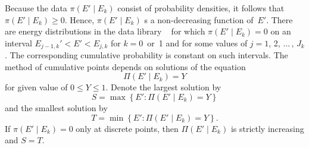 Because the data $\pi( E' \mid E_k)$ consist of probability densities,
it follows that $\pi( E' \mid E_k) \ge 0$.  Hence, $\pi( E' \mid E_k)$ 
s a non-decreasing function of~$E'$.  There are
energy distributions in the data library
\xendl~\cite{GND} for which $\pi( E' \mid E_k ) = 0$
on an interval $E_{j - 1,k}' < E' < E_{j,k}$ for $k = 0$~or~1
and for some values of $j = 1$, 2, $\ldots\,$, $J_k$.
The corresponding cumulative probability is constant
on such intervals.  The method of cumulative points
depends on solutions of the equation
$$
  \Pi(E' \mid E_k ) = Y
$$
for given value of  $0 \le Y \le 1$.  Denote the
largest solution by
$$
  S = \max \left \{ E': \Pi(E' \mid E_k ) = Y \right \}
$$
and the smallest solution by
$$
  T = \min \left \{ E': \Pi(E' \mid E_k ) = Y \right \}.
$$
If $\pi( E' \mid E_k ) = 0$ only at discrete
points, then $\Pi(E' \mid E_k )$ is strictly increasing
and $S = T$.

